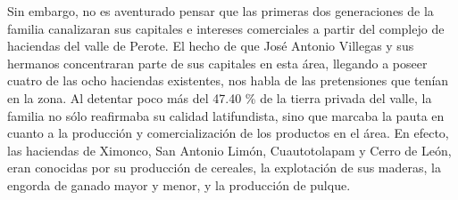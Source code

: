 \documentclass[14pt,twoside,final]{extbook} %
\begin{document}
Sin embargo, no es aventurado pensar que las primeras dos generaciones de la familia canalizaran sus capitales e intereses comerciales a partir del complejo de haciendas del valle de Perote. El hecho de que José Antonio Villegas y sus hermanos concentraran parte de sus capitales en esta área, llegando a poseer cuatro de las ocho haciendas existentes, nos habla de las pretensiones que tenían en la zona. Al detentar poco más del 47.40 \% de la tierra privada del valle, la familia no sólo reafirmaba su calidad latifundista, sino que marcaba la pauta en cuanto a la producción y comercialización de los productos en el área. En efecto, las haciendas de Ximonco, San Antonio Limón, Cuautotolapam y Cerro de León, eran conocidas por su producción de cereales, la explotación de sus maderas, la engorda de ganado mayor y menor, y la producción de pulque.
\end{document}
